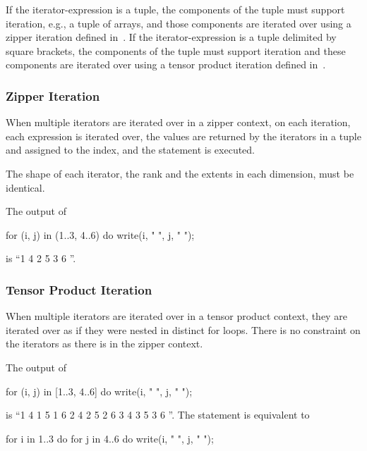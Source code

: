 If the iterator-expression is a tuple, the components of the tuple
must support iteration, e.g., a tuple of arrays, and those components
are iterated over using a zipper iteration defined
in~.  If the iterator-expression is a tuple
delimited by square brackets, the components of the tuple must support
iteration and these components are iterated over using a tensor
product iteration defined in~.

\subsubsection{Zipper Iteration}
\label{Zipper_Iteration}

When multiple iterators are iterated over in a zipper context, on each
iteration, each expression is iterated over, the values are returned
by the iterators in a tuple and assigned to the index, and the
statement is executed.

The shape of each iterator, the rank and the extents in each
dimension, must be identical.

\begin{example}
The output of
\begin{chapel}
for (i, j) in (1..3, 4..6) do
  write(i, " ", j, " ");
\end{chapel}
is ``1 4 2 5 3 6 ''.
\end{example}

\subsubsection{Tensor Product Iteration}
\label{Tensor_Product_Iteration}
When multiple iterators are iterated over in a tensor product context,
they are iterated over as if they were nested in distinct for loops.
There is no constraint on the iterators as there is in the zipper
context.

\begin{example}
The output of
\begin{chapel}
for (i, j) in [1..3, 4..6] do
  write(i, " ", j, " ");
\end{chapel}
is ``1 4 1 5 1 6 2 4 2 5 2 6 3 4 3 5 3 6 ''. The statement is
equivalent to
\begin{chapel}
for i in 1..3 do
  for j in 4..6 do
    write(i, " ", j, " ");
\end{chapel}
\end{example}

